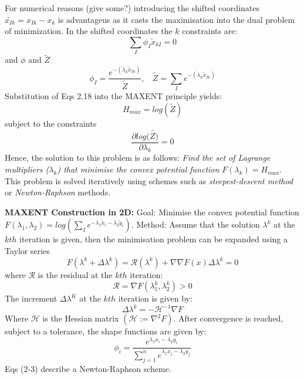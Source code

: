 For numerical reasons (give some?) introducing the shifted coordinates $\tilde{x_{Ik}} = x_{Ik} - x_k$ is advantageus as it casts the maximisation into the dual problem of minimization. In the shifted coordinates the $k$ constraints are:
\begin{equation}
\sum_I \phi_I \tilde{x}_{kI} = 0
\end{equation} 
and $\phi$ and $\tilde{Z}$
\begin{equation}
\phi_I = \frac{e^{-(\lambda_k \tilde{x}_{Ik})}}{\tilde{Z}}, ~~~~ \tilde{Z} = \sum_I e^{-(\lambda_k \tilde{x}_{Ik})}
\end{equation}
Substitution of Eqs 2.18 into the MAXENT principle yields:
\begin{equation}
H_{max} = log(\tilde{Z})
\end{equation}
subject to the constraints
\begin{equation}
\frac{\partial log(\tilde{Z)}}{\partial \lambda_k} = 0
\end{equation}
Hence, the solution to this problem is as follows: \emph{Find the set of Lagrange multipliers ($\lambda_k$) that minimise the convex potential function $F(\lambda_k) = H_{max}$}. This problem is solved iteratively using schemes such as \textit{steepest-descent method} or \textit{Newton-Raphson} methods. 
\begin{tcolorbox}
\textbf{MAXENT Construction in 2D:}
Goal: Minimise the convex potential function $F(\lambda_1,\lambda_2) = log(\sum_I e^{-\lambda_1 \tilde{x}_i - \lambda_2 \tilde{y}_i})$. Method: Assume that the solution $\lambda^k$ at the $kth$ iteration is given, then the minimisation problem can be expanded using a Taylor series
\begin{equation*}
F(\lambda^k+\Delta \lambda^k) = \mathcal{R}(\lambda^k) + \nabla \nabla F(x) \Delta \lambda^k = 0
\end{equation*}
where $\mathcal{R}$ is the residual at the $kth$ iteration:
\begin{equation*}
\mathcal{R} = \nabla F(\lambda_1^k,\lambda_2^k) > 0 
\end{equation*}
The increment $\Delta \lambda^K$ at the $kth$ iteration is given by:
\begin{equation*}
\Delta \lambda^k = -\mathcal{H}^{-1} \nabla F
\end{equation*}
Where $\mathcal{H}$ is the Hessian matrix $(\mathcal{H}:=\nabla^2 F)$. After convergence is reached, subject to a tolerance, the shape functions are given by:
\begin{equation}
\phi_i = \frac{e^{\lambda_1 x_i - \lambda_2 y_i}}{\sum_{j=1}^ne^{\lambda_1 x_j - \lambda_2 y_j} } 
\end{equation}
Eqs (2-3) describe a Newton-Raphson scheme.
\end{tcolorbox}

